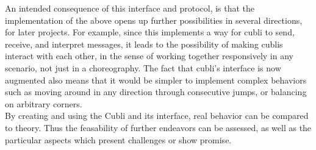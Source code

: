 An intended consequence of this interface and protocol, is that the implementation of the above opens up further possibilities in several directions, for later projects. 
For example, since this implements a way for cubli to send, receive, and interpret messages, it leads to the possibility of making cublis interact with each other, in the sense of working together responsively in any scenario, not just in a choreography.
The fact that cubli's interface is now augmented also means that it would be simpler to implement complex behaviors such as moving around in any direction through consecutive jumps, or balancing on arbitrary corners.\\

By creating and using the Cubli and its interface, real behavior can be compared to theory. Thus the feasability of further endeavors can be assessed, as well as the particular aspects which present challenges or show promise.

 \cleardoublepage


